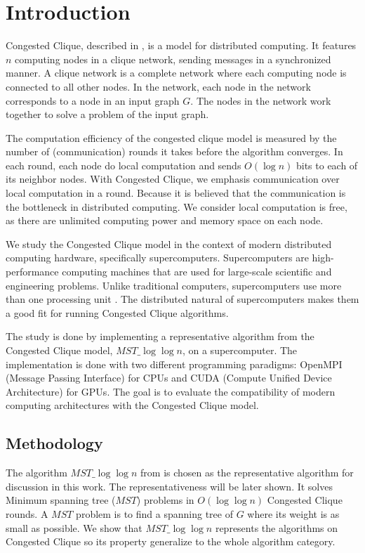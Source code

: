 \documentclass[english, 12pt, a4paper, elec, utf8, a-2b, online]{aaltothesis}
\newcommand{\mstalgo}{$MST\_\log\log{n}$}
\begin{document}
\cleardoublepage

\section{Introduction}
\label{sec:Introduction}

\thispagestyle{empty}
Congested Clique, described in \cite{powerCongestClique}, is a model for distributed computing. It features $n$ computing nodes in a clique network, sending messages in a synchronized manner. A clique network is a complete network where each computing node is connected to all other nodes. In the network, each node in the network corresponds to a node in an input graph $G$. The nodes in the network work together to solve a problem of the input graph.

The computation efficiency of the congested clique model is measured by the number of (communication) rounds it takes before the algorithm converges. In each round, each node do local computation and sends $O(\log{n})$ bits to each of its neighbor nodes. With Congested Clique, we emphasis communication over local computation in a round. Because it is believed that the communication is the bottleneck in distributed computing. We consider local computation is free, as there are unlimited computing power and memory space on each node.

We study the Congested Clique model in the context of modern distributed computing hardware, specifically supercomputers. Supercomputers are high-performance computing machines that are used for large-scale scientific and engineering problems. Unlike traditional computers, supercomputers use more than one processing unit \cite{IBMsupercomputing}. The distributed natural of supercomputers makes them a good fit for running Congested Clique algorithms.

The study is done by implementing a representative algorithm from the Congested Clique model, \mstalgo{}, on a supercomputer. The implementation is done with two different programming paradigms: OpenMPI (Message Passing Interface) for CPUs and CUDA (Compute Unified Device Architecture) for GPUs. The goal is to evaluate the compatibility of modern computing architectures with the Congested Clique model.

\subsection{Methodology}
The algorithm \mstalgo{} from \cite{MSTLogLogn} is chosen as the representative algorithm for discussion in this work. The representativeness will be later shown. It solves Minimum spanning tree ($MST$) problems in $O(\log{\log{n}})$ Congested Clique rounds. A $MST$ problem is to find a spanning tree of $G$ where its weight is as small as possible.  We show that \mstalgo{} represents the algorithms on Congested Clique so its property generalize to the whole algorithm category. 
\end{document}

